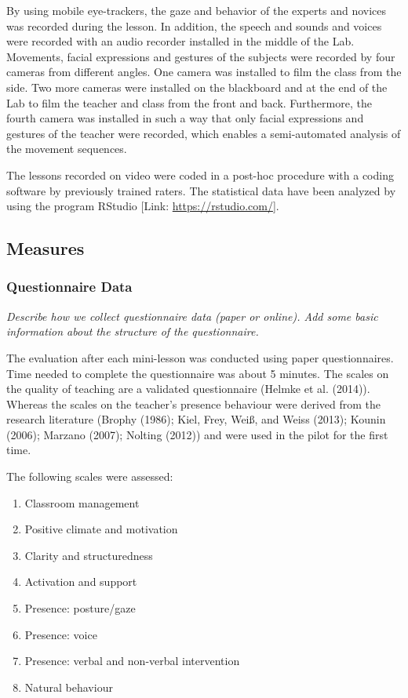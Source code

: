 \documentclass[
  english,
  man,floatsintext]{apa6}
\providecommand{\tightlist}{%
  \setlength{\itemsep}{0pt}\setlength{\parskip}{0pt}}
\begin{document}
By using mobile eye-trackers, the gaze and behavior of the experts and novices was recorded during the lesson. In addition, the speech and sounds and voices were recorded with an audio recorder installed in the middle of the Lab. Movements, facial expressions and gestures of the subjects were recorded by four cameras from different angles. One camera was installed to film the class from the side. Two more cameras were installed on the blackboard and at the end of the Lab to film the teacher and class from the front and back. Furthermore, the fourth camera was installed in such a way that only facial expressions and gestures of the teacher were recorded, which enables a semi-automated analysis of the movement sequences.

The lessons recorded on video were coded in a post-hoc procedure with a coding software by previously trained raters. The statistical data have been analyzed by using the program RStudio {[}Link: \url{https://rstudio.com/}{]}.

\hypertarget{measures}{%
\subsection{Measures}\label{measures}}

\hypertarget{questionnaire-data}{%
\subsubsection{Questionnaire Data}\label{questionnaire-data}}

\emph{Describe how we collect questionnaire data (paper or online). Add some basic information about the structure of the questionnaire.}

The evaluation after each mini-lesson was conducted using paper questionnaires. Time needed to complete the questionnaire was about 5 minutes.
The scales on the quality of teaching are a validated questionnaire (Helmke et al. (2014)). Whereas the scales on the teacher's presence behaviour were derived from the research literature (Brophy (1986); Kiel, Frey, Weiß, and Weiss (2013); Kounin (2006); Marzano (2007); Nolting (2012)) and were used in the pilot for the first time.

The following scales were assessed:

\begin{enumerate}
\def\labelenumi{(\arabic{enumi})}
\tightlist
\item
  Classroom management
\item
  Positive climate and motivation
\item
  Clarity and structuredness
\item
  Activation and support
\item
  Presence: posture/gaze
\item
  Presence: voice
\item
  Presence: verbal and non-verbal intervention
\item
  Natural behaviour
\end{enumerate}
\end{document}
